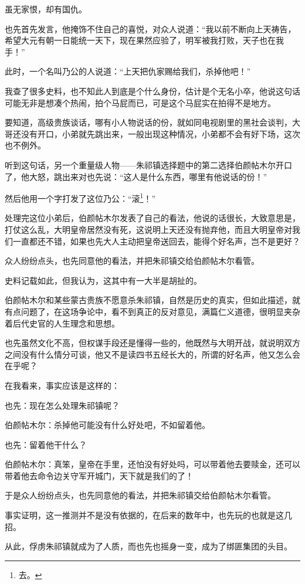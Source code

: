 \begin{multicols}{\theparacolNo}
虽无家恨，却有国仇。

也先首先发言，他掩饰不住自己的喜悦，对众人说道：“我以前不断向上天祷告，希望大元有朝一日能统一天下，现在果然应验了，明军被我打败，天子也在我手！”

此时，一个名叫乃公的人说道：“上天把仇家赐给我们，杀掉他吧！”

我查了很多史料，也不知此人到底是个什么身份，估计是个无名小卒，他说这句话可能无非是想凑个热闹，拍个马屁而已，可是这个马屁实在拍得不是地方。

要知道，高级贵族谈话，哪有小人物说话的份，就如同电视剧里的黑社会谈判，大哥还没有开口，小弟就先跳出来，一般出现这种情况，小弟都不会有好下场，这次也不例外。

听到这句话，另一个重量级人物——朱祁镇选择题中的第二选择伯颜帖木尔开口了，他大怒，跳出来对也先说：“这人是什么东西，哪里有他说话的份！”

然后他用一个字打发了这位乃公：“滚\footnote{去。}！”

处理完这位小弟后，伯颜帖木尔发表了自己的看法，他说的话很长，大致意思是，打仗这么乱，大明皇帝居然没有死，这说明上天还没有抛弃他，而且大明皇帝对我们一直都还不错，如果也先大人主动把皇帝送回去，能得个好名声，岂不是更好？

众人纷纷点头，也先同意他的看法，并把朱祁镇交给伯颜帖木尔看管。

史料记载如此，但我认为，这其中有一大半是胡扯的。

伯颜帖木尔和某些蒙古贵族不愿意杀朱祁镇，自然是历史的真实，但如此描述，就有点问题了，在这场争论中，看不到真正的反对意见，满篇仁义道德，很明显夹杂着后代史官的人生理念和思想。

也先虽然文化不高，但权谋手段还是懂得一些的，他既然与大明开战，就说明双方之间没有什么情分可谈，他又不是读四书五经长大的，所谓的好名声，他又怎么会在乎呢？

在我看来，事实应该是这样的：

也先：现在怎么处理朱祁镇呢？

伯颜帖木尔：杀掉他可能没有什么好处吧，不如留着他。

也先：留着他干什么？

伯颜帖木尔：真笨，皇帝在手里，还怕没有好处吗，可以带着他去要赎金，还可以带着他去命令边关守军开城门，天下就是我们的了！

于是众人纷纷点头，也先同意他的看法，并把朱祁镇交给伯颜帖木尔看管。

事实证明，这一推测并不是没有依据的，在后来的数年中，也先玩的也就是这几招。

从此，俘虏朱祁镇就成为了人质，而也先也摇身一变，成为了绑匪集团的头目。


\end{multicols}
